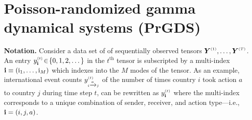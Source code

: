 \documentclass{article}
\begin{document}


\section{Poisson-randomized gamma dynamical systems (PrGDS)}
\label{sec:prgds}

\textbf{Notation.} Consider a data set of of sequentially observed tensors $\boldsymbol{Y}^{\mathsmaller{(1)}},\dots,\boldsymbol{Y}^{\mathsmaller{(T)}}$. An entry $\ydt \!\in\! \{0,1,2,\dots\}$ in the $t^{\textrm{th}}$ tensor is subscripted by a multi-index $\textbf{\textrm{i}} \equiv (\textrm{i}_1,\dots,\textrm{i}_M)$ which indexes into the $M$ modes of the tensor. As an example, international event counts $y^{\mathsmaller{(t)}}_{\mathsmaller{i \xrightarrow{a} j}}$ of the number of times country $i$ took action $a$ to country $j$ during time step $t$, can be rewritten as $\ydt$  where the multi-index corresponds to a unique combination of sender, receiver, and action type---i.e., $\textbf{\textrm{i}} = (i, j, a)$.~
\end{document}
